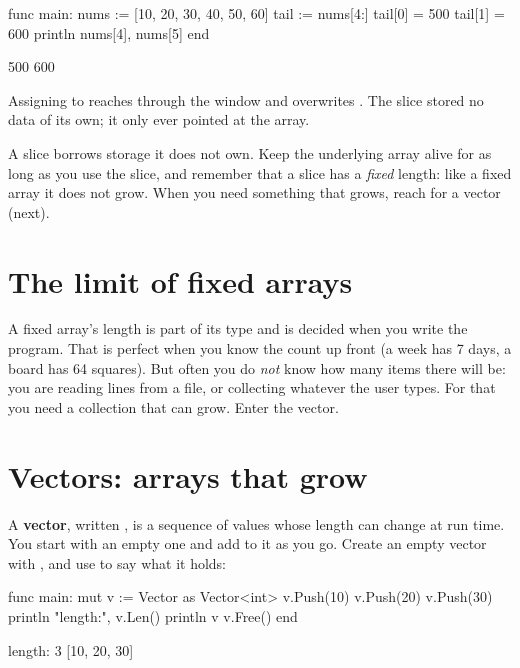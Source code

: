 \begin{salamen}
func main:
    nums := [10, 20, 30, 40, 50, 60]
    tail := nums[4:]
    tail[0] = 500
    tail[1] = 600
    println nums[4], nums[5]
end
\end{salamen}

\begin{progout}
500 600
\end{progout}

Assigning to  reaches through the window and overwrites
. The slice stored no data of its own; it only ever pointed at the
array.

\begin{warn}
A slice borrows storage it does not own. Keep the underlying array alive for as
long as you use the slice, and remember that a slice has a \emph{fixed} length:
like a fixed array it does not grow. When you need something that grows, reach for
a vector (next).
\end{warn}

\section{The limit of fixed arrays}

A fixed array's length is part of its type and is decided when you write the
program. That is perfect when you know the count up front (a week has 7 days, a
board has 64 squares). But often you do \emph{not} know how many items there will
be: you are reading lines from a file, or collecting whatever the user types.
For that you need a collection that can grow. Enter the vector.

\section{Vectors: arrays that grow}

A \textbf{vector}, written , is a sequence of  values
whose length can change at run time. You start with an empty one and add to it as
you go. Create an empty vector with , and use  to say
what it holds:

\begin{salamen}
func main:
    mut v := Vector {} as Vector<int>
    v.Push(10)
    v.Push(20)
    v.Push(30)
    println "length:", v.Len()
    println v
    v.Free()
end
\end{salamen}

\begin{progout}
length: 3
[10, 20, 30]
\end{progout}

